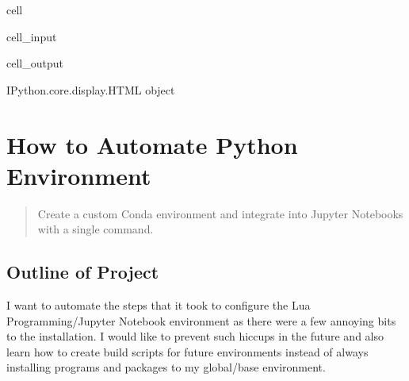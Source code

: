 \documentclass[letterpaper,12pt,english]{sphinxmanual}
\begin{document}
\begin{sphinxuseclass}{cell}
\begin{sphinxuseclass}{cell_input}
\begin{sphinxVerbatim}[commandchars=\\\{\}]
\end{sphinxVerbatim}

\end{sphinxuseclass}
\begin{sphinxuseclass}{cell_output}
\begin{sphinxVerbatim}[commandchars=\\\{\}]
\PYGZlt{}IPython.core.display.HTML object\PYGZgt{}
\end{sphinxVerbatim}

\end{sphinxuseclass}
\end{sphinxuseclass}

\chapter{How to Automate Python Environment}
\label{\detokenize{notebooks/01-automating-setup:how-to-automate-python-environment}}\label{\detokenize{notebooks/01-automating-setup::doc}}\begin{quote}

\sphinxAtStartPar
{}

\sphinxAtStartPar
Create a custom Conda environment and integrate into Jupyter Notebooks with a single command.
\end{quote}


\section{Outline of Project}
\label{\detokenize{notebooks/01-automating-setup:outline-of-project}}
\sphinxAtStartPar
I want to automate the steps that it took to configure the Lua Programming/Jupyter Notebook  environment as there were a few annoying bits to the installation. I would like to prevent such hiccups in the future and also learn how to create build scripts for future environments instead of always installing programs and packages to my global/base environment.
\end{document}
